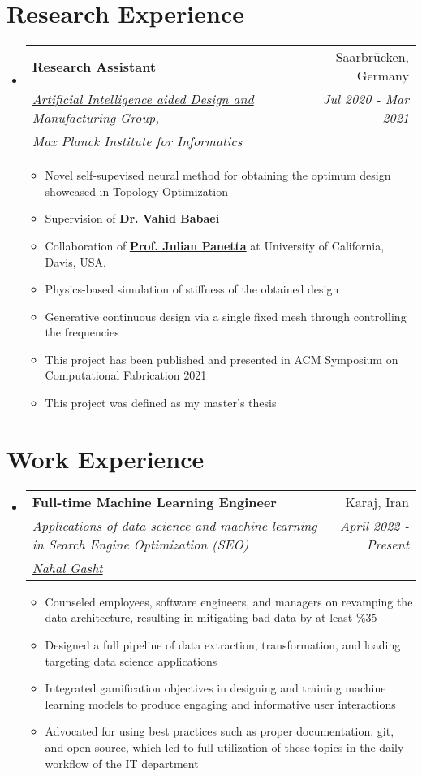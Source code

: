 \documentclass[letterpaper,11pt]{article}
\makeatletter
\newcommand{\resumeItem}[1]{
  \item\small{
    {#1 \vspace{-2pt}}
  }
}
\newcommand{\resumeSubheading}[5]{
  \item
    \begin{tabular*}{0.97\textwidth}{l@{\extracolsep{\fill}}r}
      \textbf{#1} & #2 \\ 
      \textit{\small#3} & \textit{\small #4} \\
      \textit{#5} & 
    \end{tabular*}\vspace{-5pt}
}
\newcommand{\resumeSubHeadingListStart}{\begin{itemize}[leftmargin=*]}
\newcommand{\resumeSubHeadingListEnd}{\end{itemize}}
\newcommand{\resumeItemListStart}{\begin{itemize}}
\newcommand{\resumeItemListEnd}{\end{itemize}\vspace{-5pt}}
\makeatother
\begin{document}
\section{Research Experience}
  \resumeSubHeadingListStart
    \resumeSubheading
      {Research Assistant}{Saarbr{\"u}cken, Germany}
      {\href{http://aidam.mpi-inf.mpg.de/?view=home}{Artificial Intelligence aided Design and Manufacturing Group, } 
      }{Jul 2020 - Mar 2021}{Max Planck Institute for Informatics}
     
      \resumeItemListStart
        \resumeItem{Novel self-supevised neural method for obtaining the optimum design showcased in Topology Optimization}
        \resumeItem{Supervision of \href{http://aidam.mpi-inf.mpg.de/?view=people_vahid} {\textbf{Dr. Vahid Babaei}}}
        \resumeItem{Collaboration of \href{https://www.julianpanetta.com/}{\textbf{Prof. Julian Panetta}} at University of California, Davis, USA.}
        \resumeItem{Physics-based simulation of stiffness of the obtained design}
        \resumeItem{Generative continuous design via a single fixed mesh through controlling the frequencies}
        \resumeItem{This project has been published and presented in ACM Symposium on Computational Fabrication 2021}
        \resumeItem{This project was defined as my master's thesis}
      \resumeItemListEnd
      
  \resumeSubHeadingListEnd
  
\section{Work Experience}
  \resumeSubHeadingListStart
    \resumeSubheading
      {Full-time Machine Learning Engineer}{Karaj, Iran}
       {Applications of data science and machine learning in Search Engine Optimization (SEO)
       }
      {April 2022 - Present}{\href{https://nahalgasht.com/}{Nahal Gasht}}
     
      \resumeItemListStart
        \resumeItem{Counseled employees, software engineers, and managers on revamping the data architecture, resulting in mitigating bad data by at least \%35}
        \resumeItem{Designed a full pipeline of data extraction, transformation, and loading targeting data science applications}
        \resumeItem{Integrated gamification objectives in designing and training machine learning models to produce engaging and informative user interactions}
        \resumeItem{Advocated for using best practices such as proper documentation, git, and open source, which led to full utilization of these topics in the daily workflow of the IT department}
      \resumeItemListEnd
  \resumeSubHeadingListEnd
\end{document}
